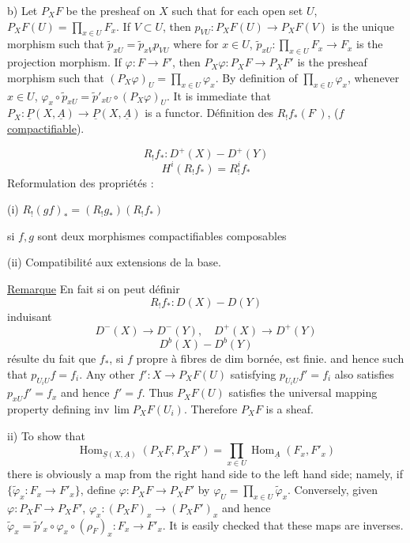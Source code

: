 b) Let $P_XF$ be the presheaf on $X$ such that for each open set $U$, $P_XF(U)=\prod_{x\in U}F_x$. If $V\subset U$, then $p_{VU}:P_XF(U)\longrightarrow P_XF(V)$ is the unique morphism such that $\widetilde{p}_{xU}=\widetilde{p}_{xV}p_{VU}$ where for $x\in U$, $\widetilde{p}_{xU}:\prod_{x\in U}F_x\longrightarrow F_x$ is the projection morphism. If $\varphi:F\longrightarrow F'$, then $P_X\varphi:P_XF\longrightarrow P_XF'$ is the presheaf morphism such that $(P_X\varphi)_U=\prod_{x\in U}\varphi_x$. By definition of $\prod_{x\in U}\varphi_x$, whenever $x\in U$, $\varphi_x\circ\widetilde{p}_{xU}=\widetilde{p}'_{xU}\circ(P_X\varphi)_U$. It is immediate that $P_X:\underline{P}(X,\underline{A})\longrightarrow\underline{P}(X,\underline{A})$ is a functor.
Définition des $R_!f_*(F^\cdot)$, ($f$ \uline{compactifiable}).

\[
R_!f_*:D^+(X)-D^+(Y)
\]
\[
H^i(R_!f_*)=R^i_!f_*
\]
Reformulation des propriétés  :

(i) $R_!(gf)_*=(R_!g_*)(R_!f_*)$

si $f,g$ sont deux morphismes compactifiables composables

(ii) Compatibilité aux extensions de la base.

\uline{Remarque} En fait si  on peut définir
\[
R_!f_*:D(X)-D(Y)
\]
induisant
\[
D^-(X)\longrightarrow D^-(Y),\quad D^+(X)\longrightarrow D^+(Y)
\]
\[
D^b(X)-D^b(Y)
\]
 résulte du fait que $f_*$, si $f$ propre à fibres de dim bornée, est  finie.
and hence such that $p_{U_iU}f=f_i$. Any other $f':X\longrightarrow P_XF(U)$ satisfying $p_{U_iU}f'=f_i$ also satisfies $p_{xU}f'=f_x$ and hence $f'=f$. Thus $P_XF(U)$ satisfies the universal mapping property defining $\mathrm{inv}\,\lim P_XF(U_i)$. Therefore $P_XF$ is a sheaf.

ii) To show that
\[
\operatorname{Hom}_{\underline{S}(X,\underline{A})}(P_XF,P_XF')=\prod_{x\in U}\operatorname{Hom}_{\underline{A}}(F_x,F'_x)
\]
there is obviously a map from the right hand side to the left hand side; namely, if $\{\widetilde{\varphi}_x:F_x\longrightarrow F'_x\}$, define $\varphi:P_XF\longrightarrow P_XF'$ by $\varphi_U=\prod_{x\in U}\widetilde{\varphi}_x$. Conversely, given $\varphi:P_XF\longrightarrow P_XF'$, $\varphi_x:(P_XF)_x\longrightarrow(P_XF')_x$ and hence $\widetilde{\varphi}_x=\widetilde{p}'_x\circ\varphi_x\circ(\rho_F)_x:F_x\longrightarrow F'_x$. It is easily checked that these maps are inverses.


